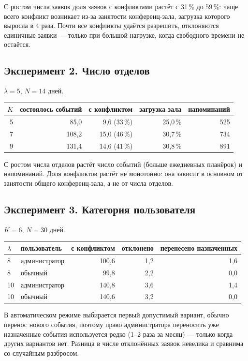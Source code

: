 \documentclass[12pt,a4paper]{article}
\begin{document}
С ростом числа заявок доля заявок с конфликтами растёт с 31\,\% до 59\,\%:
чаще всего конфликт возникает из-за занятости конференц-зала, загрузка которого
выросла в 4 раза. Почти все конфликты удаётся разрешить, отклоняются единичные
заявки --- только при большой нагрузке, когда свободного времени не остаётся.

\subsection*{Эксперимент 2. Число отделов}
$\lambda = 5$, $N = 14$ дней.

\begin{center}
\begin{tabular}{rrrrr}
\toprule
$K$ & состоялось событий & с конфликтом & загрузка зала & напоминаний \\
\midrule
5 & 85,0  & 9,6 (33\,\%)  & 25,0\,\% & 525 \\
7 & 108,2 & 15,0 (46\,\%) & 30,7\,\% & 734 \\
9 & 131,4 & 14,6 (41\,\%) & 30,8\,\% & 891 \\
\bottomrule
\end{tabular}
\end{center}

С ростом числа отделов растёт число событий (больше ежедневных планёрок) и
напоминаний. Доля конфликтов растёт не монотонно: она зависит в основном от
занятости общего конференц-зала, а не от числа отделов.

\subsection*{Эксперимент 3. Категория пользователя}
$K = 6$, $N = 30$ дней.

\begin{center}
\begin{tabular}{llrrr}
\toprule
$\lambda$ & пользователь & с конфликтом & отклонено & перенесено назначенных \\
\midrule
8  & администратор & 100,6 & 1,2 & 1,6 \\
8  & обычный       & 99,8  & 2,2 & 0,0 \\
10 & администратор & 140,8 & 3,6 & 1,4 \\
10 & обычный       & 140,6 & 3,2 & 0,0 \\
\bottomrule
\end{tabular}
\end{center}

В автоматическом режиме выбирается первый допустимый вариант, обычно перенос
нового события, поэтому право администратора переносить уже назначенные события
используется редко (1--2 раза за месяц) --- только когда других вариантов нет.
Разница в числе отклонённых заявок невелика и сравнима со случайным разбросом.
\end{document}
